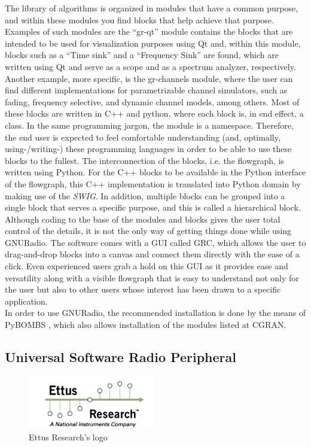 The library of algorithms is organized in modules that have a common purpose, and within these modules you find blocks that help achieve that purpose. Examples of such modules are the “gr-qt” module contains the blocks that are intended to be used for visualization purposes using Qt \cite{Qt} and, within this module, blocks such as a “Time sink” and a “Frequency Sink” are found, which are written using Qt and serve as a scope and as a spectrum analyzer, respectively. Another example, more specific, is the gr-channels module, where the user can find different implementations for parametrizable channel simulators, such as fading, frequency selective, and dynamic channel models, among others. Most of these blocks are written in C++ and python, where each block is, in end effect, a class. In the same programming jargon, the module is a namespace. Therefore, the end user is expected to feel comfortable understanding (and, optimally, using-/writing-) these programming languages in order to be able to use these blocks to the fullest. The interconnection of the blocks, i.e. the flowgraph, is written using Python. For the C++ blocks to be available in the Python interface of the flowgraph, this C++ implementation is translated into Python domain by making use of the \emph{\ac{SWIG}}. In addition, multiple blocks can be grouped into a single block that serves a specific purpose, and this is called a hierarchical block.\\

Although coding to the base of the modules and blocks gives the user total control of the details, it is not the only way of getting things done while using GNURadio. The software comes with a \ac{GUI} called \ac{GRC}, which allows the user to drag-and-drop blocks into a canvas and connect them directly with the ease of a click. Even experienced users grab a hold on this \ac{GUI} as it provides ease and versatility along with a visible flowgraph that is easy to understand not only for the user but also to other users whose interest has been drawn to a specific application.\\

In order to use GNURadio, the recommended installation is done by the means of \ac{PyBOMBS} \cite{PyBOMBS}, which also allows installation of the modules listed at \ac{CGRAN}.

\subsection{Universal Software Radio Peripheral}
\begin{figure}[htb]
    \centering
      \includegraphics[width=0.5\textwidth]{figures/ettus_logo}
      \caption{Ettus Research's logo}
      \label{fig:ettus}
\end{figure}

